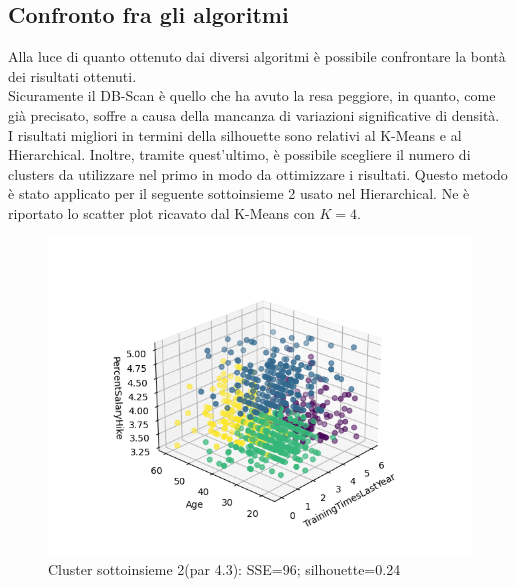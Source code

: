 \documentclass[a4paper,9pt]{article}
\begin{document}

\subsection{Confronto fra gli algoritmi}
Alla luce di quanto ottenuto dai diversi algoritmi è possibile confrontare la bontà dei risultati ottenuti.\\
Sicuramente il DB-Scan è quello che ha avuto la resa peggiore, in quanto, come già precisato, soffre a causa della mancanza di variazioni significative di densità.\\
I risultati migliori in termini della silhouette sono relativi al K-Means e al Hierarchical. Inoltre, tramite quest'ultimo, è possibile scegliere il numero di clusters da utilizzare nel primo in modo da ottimizzare i risultati. Questo metodo è stato applicato per il seguente sottoinsieme 2 usato nel Hierarchical.
Ne è riportato lo scatter plot ricavato dal K-Means con $K=4$.
\begin{figure}[H]
    \centering
    \includegraphics[scale=0.65]{FromHierarchicalKmeansDF2.png}
    \caption{Cluster sottoinsieme 2(par 4.3): SSE=96; silhouette=0.24 }
    \label{fig:my_label}
\end{figure}
\end{document}
